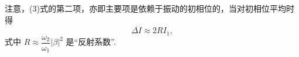 \begin{xiti}
注意，(3)式的第二项，亦即主要项是依赖于振动的初相位的，当对初相位平均时得
\begin{equation*}
  \overline{\Delta I}\approx 2RI_1,
\end{equation*}
式中 $R\approx\dfrac{\omega_2}{\omega_1}|\beta|^2$ 是“反射系数”.

\end{xiti}
\renewcommand{\theequation}{\arabic{section}.\arabic{equation}}%
